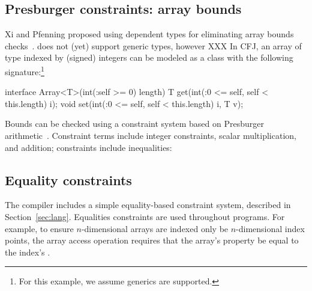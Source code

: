 \subsection{Presburger constraints: array bounds}

Xi and Pfenning proposed using dependent types for eliminating
array bounds checks~\cite{xi98array}.
\Xten{} does not (yet) support generic types, however XXX
%
In CFJ, an array of type  indexed by (signed) integers
can be modeled as a class with the following
signature:\footnote{For this example, we assume generics
are supported.}
\begin{displayxten}
interface Array<T>(int(:self >= 0) length) {
  T get(int(:0 <= self, self < this.length) i);
  void set(int(:0 <= self, self < this.length) i, T v);
}
\end{displayxten}

Bounds can be checked using a constraint system based on
Presburger arithmetic~\cite{omega}.  Constraint terms include
integer constraints, scalar multiplication, and addition;
constraints include inequalities:
\fi





\subsection{Equality constraints}

The \Xten{} compiler includes a simple equality-based constraint
system, described in Section~\ref{sec:lang}.
Equalities constraints
are used throughout \Xten{} programs.  For example, to ensure
$n$-dimensional arrays are indexed only be $n$-dimensional
index points, the array access operation requires that the
array's  property be equal to the index's .





